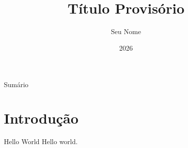 \documentclass{beamer}
\title{Título Provisório}
\author{Seu Nome}
\date{2026}
\begin{document}
\begin{frame}
\titlepage
\end{frame}

\begin{frame}{Sumário}
\tableofcontents
\end{frame}

\section{Introdução}

\begin{frame}{Hello World}
Hello world.
\end{frame}



\end{document}
